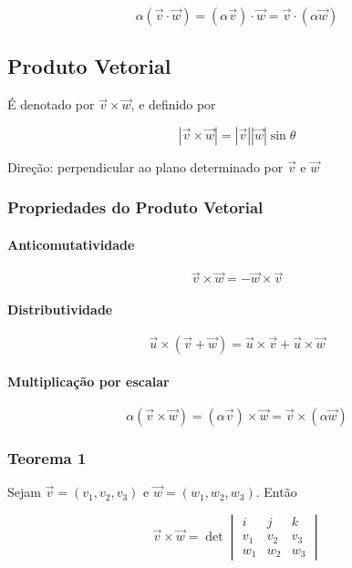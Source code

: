 \[
\alpha (\vec{v} \cdot \vec{w}) = (\alpha \vec{v}) \cdot \vec{w} = \vec{v} \cdot (\alpha \vec{w})
\]

\subsection{Produto Vetorial}\label{produto-vetorial}

É denotado por $\vec{v} \times \vec{w}$, e definido por

\[
|\vec{v} \times \vec{w}| = |\vec{v}| |\vec{w}| \sin \theta
\]

Direção: perpendicular ao plano determinado por $\vec{v}$ e $\vec{w}$

\subsubsection{Propriedades do Produto
Vetorial}\label{propriedades-do-produto-vetorial}

\paragraph{Anticomutatividade}\label{anticomutatividade}

\[
\vec{v} \times \vec{w} = - \vec{w} \times \vec{v}
\]

\paragraph{Distributividade}\label{distributividade-2}

\[
\vec{u} \times (\vec{v} + \vec{w}) = \vec{u} \times \vec{v} + \vec{u} \times \vec{w}
\]

\paragraph{Multiplicação por
escalar}\label{multiplicauxe7uxe3o-por-escalar-1}

\[
\alpha (\vec{v} \times \vec{w}) = (\alpha \vec{v}) \times \vec{w} = \vec{v} \times (\alpha \vec{w})
\]

\subsubsection{Teorema 1}\label{teorema-1}

Sejam $\vec{v} = (v_1, v_2, v_3)$ e $\vec{w} = (w_1, w_2, w_3)$. Então

\[
\vec{v} \times \vec{w}
= \det
\begin{vmatrix}
i & j & k \\
v_1 & v_2 & v_3 \\
w_1 & w_2 & w_3
\end{vmatrix}
\]

